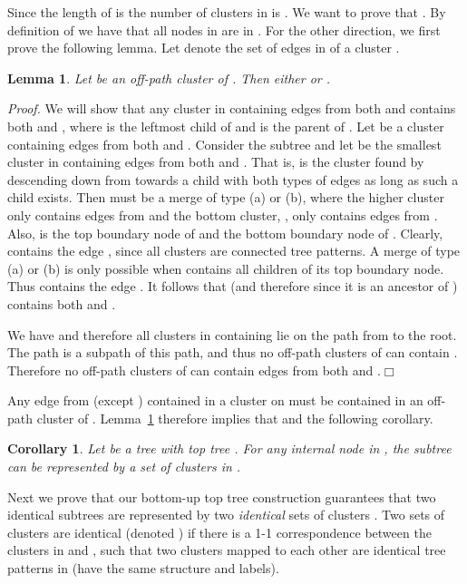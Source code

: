 \documentclass [11pt]{article}
\newtheorem{lemma}{Lemma}
\newtheorem{corollary}{Corollary}
\newcommand{\qed}{\hfill\ensuremath{\Box}\medskip\\\noindent}
\newenvironment{proof}{\noindent\emph{Proof. }}{}
\begin{document}
Since the length of  is  the number of clusters in  is . We want to prove that . 
By definition of  we have that all nodes in  are in . For the other direction, we first prove the following lemma. Let  denote the set of edges in  of a cluster .
\begin{lemma}\label{lem:offpath}
Let  be an off-path  cluster of . Then either  or .
\end{lemma}
\begin{proof}
We will show that any cluster in  containing edges from both  and  contains both  and , where  is the leftmost child of  and  is the parent of . Let  be a cluster containing edges from both  and . 
Consider the subtree  and let  be the smallest cluster in   containing edges from both  and . That is,   is the cluster found by descending down from  towards a child with both types of edges as long as such a child exists. Then  must be a merge of type (a) or (b), where the higher cluster  only contains edges from  and the bottom cluster, , only contains edges from . Also,  is the top boundary node of  and the bottom boundary node of . Clearly,  contains the edge , since all clusters are connected tree patterns. A merge of type (a) or (b) is only possible when  contains all children of its top boundary node. Thus  contains the edge . It follows that  (and therefore  since it is an ancestor of ) contains both  and .

We have  and therefore all clusters in  containing  lie on the path from  to the root. The path  is a subpath of this path, and thus no off-path clusters of  can contain . Therefore no off-path clusters of  can contain edges from both  and .\qed
\end{proof}


Any edge from  (except ) contained in a cluster on  must be contained in an off-path cluster of . Lemma~\ref{lem:offpath} therefore implies that  and the following corollary.



\begin{corollary}
Let  be a tree with top tree . For any internal node  in , the subtree  can be represented by a set of  clusters in .
\end{corollary}

Next we prove that our bottom-up top tree construction guarantees that two identical subtrees  are represented by two {\em identical} sets of clusters . Two sets of clusters are identical (denoted ) if there is a 1-1 correspondence between the clusters in  and , such that two clusters mapped to each other are identical tree patterns in  (have the same structure and labels).
\end{document}
